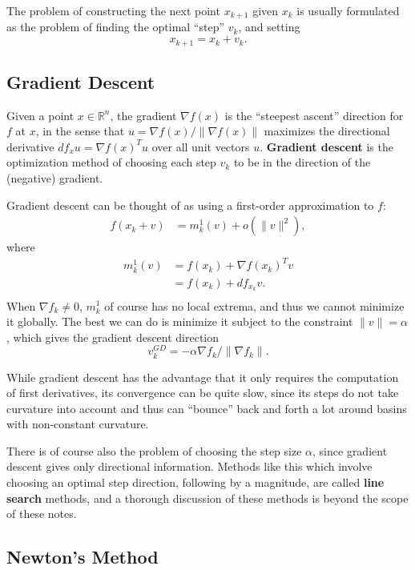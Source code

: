 \documentclass[reqno]{amsart}
\numberwithin{equation}{section}
\begin{document}
The problem of constructing the next point $x_{k+1}$ given $x_k$ is usually formulated
as the problem of finding the optimal ``step'' $v_k$, and setting
$$
    x_{k+1} = x_k + v_k.
$$

\subsection{Gradient Descent}

Given a point $x \in \mathbb R^n$, the gradient $\nabla f(x)$ is the ``steepest
ascent'' direction for $f$ at $x$,
in the sense that $u = \nabla f(x) / \| \nabla f(x) \|$ maximizes
the directional derivative $df_x u = \nabla f(x)^T u$ over all unit vectors $u$.
\textbf{Gradient descent} is the optimization method of choosing each step $v_k$ to
be in the direction of the (negative) gradient.

Gradient descent can be thought of as using a first-order approximation to $f$:
\begin{align*}
    f(x_k + v) &= m^1_k(v) + o(\|v\|^2),
\end{align*}
where
\begin{align*}
    m^1_k(v) &= f(x_k) + \nabla f(x_k)^T v \\
        &= f(x_k) + df_{x_k} v. \\
\end{align*}
When $\nabla f_k \ne 0$, $m^1_k$ of course has no local extrema, and thus we cannot minimize
it globally. The best we can do is minimize it subject to the constraint $\|v\| = \alpha$,
which gives the gradient descent direction
$$
    v^{GD}_k = - \alpha \nabla f_k / \| \nabla f_k \|.
$$

While gradient descent has the advantage that it only requires the computation of
first derivatives, its
convergence can be quite slow, since its steps do not take curvature
into account and thus can ``bounce'' back and forth a lot around basins with non-constant
curvature.

There is of course also the problem of choosing the step size $\alpha$, since
gradient descent gives only directional information. Methods like this
which involve choosing
an optimal step direction, following by a magnitude, are called \textbf{line search}
methods, and a thorough discussion of these methods is beyond the scope of these notes.

\subsection{Newton's Method}
\end{document}

